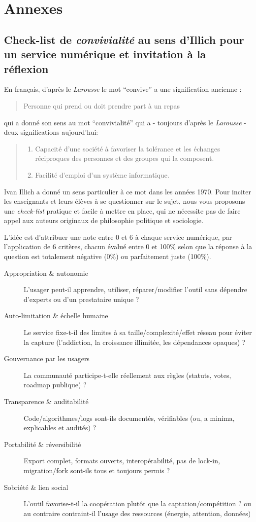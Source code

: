 \documentclass[11pt,a4paper]{article}
\begin{document}
\newpage
\section{Annexes}

\subsection{Check-list de \textit{convivialité} au sens d'Illich pour un service numérique et invitation à la réflexion}
En français, d'après le \textit{Larousse} le mot ``convive'' a une signification ancienne : \begin{quote}
    Personne qui prend ou doit prendre part à un repas
\end{quote} qui a donné son sens au mot ``convivialité'' qui a - toujours d'après le \textit{Larousse} - deux significations aujourd'hui: \begin{quote}
\begin{enumerate}
    \item Capacité d'une société à favoriser la tolérance et les échanges réciproques des personnes et des groupes qui la composent.
    \item Facilité d'emploi d'un système informatique.
\end{enumerate}
\end{quote}
Ivan Illich a donné un sens particulier à ce mot dans les années 1970. Pour inciter les enseignants et leurs élèves à se questionner sur le sujet, nous vous proposons une \textit{check-list} pratique et facile à mettre en place, qui ne nécessite pas de faire appel aux auteurs originaux de philosophie politique et sociologie.
\par L'idée est d'attribuer une note entre 0 et 6 à chaque service numérique, par l'application de 6 critères, chacun évalué entre 0 et 100\% selon que la réponse à la question est totalement négative (0\%) ou parfaitement juste (100\%).
\begin{description}
    \item[Appropriation \& autonomie] L’usager peut-il apprendre, utiliser, réparer/modifier l’outil sans dépendre d’experts ou d’un prestataire unique ?
    \item[Auto-limitation \& échelle humaine] Le service fixe-t-il des limites à sa taille/complexité/effet réseau pour éviter la capture (l'addiction, la croissance illimitée, les dépendances opaques) ?
    \item[Gouvernance par les usagers] La communauté participe-t-elle réellement aux règles (statuts, votes, roadmap publique) ?
    \item[Transparence \& auditabilité] Code/algorithmes/logs sont-ils documentés, vérifiables (ou, a minima, explicables et audités) ?
    \item[Portabilité \& réversibilité] Export complet, formats ouverts, interopérabilité, pas de lock-in, migration/fork sont-ils tous et toujours permis ?
    \item[Sobriété \& lien social] L'outil favorise-t-il la coopération plutôt que la captation/compétition ? ou au contraire contraint-il l’usage des ressources (énergie, attention, données)
\end{description}
\end{document}
